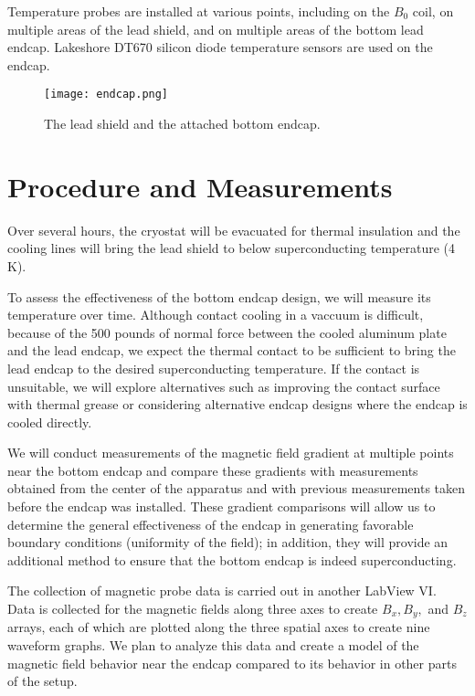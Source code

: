 \documentclass[twocolumn,aps,prb,citeautoscript]{revtex4-1}
\begin{document}
Temperature probes are installed at various points, including on the $B_0$
coil, on multiple areas of the lead shield, and on multiple areas of the
bottom lead endcap. Lakeshore DT670 silicon diode temperature sensors are
used on the endcap.

\begin{figure}
\texttt{[image: endcap.png]}
\caption{\label{fig:endcap}The lead shield and the attached bottom endcap.}
\end{figure}

\section{Procedure and Measurements}

Over several hours, the cryostat will be evacuated for thermal insulation and
the cooling lines will bring the lead shield to below superconducting
temperature (4 K).

To assess the effectiveness of the bottom endcap design, we will
measure its temperature over time. Although contact cooling in a vaccuum
is difficult, because of the 500 pounds of normal force between the
cooled aluminum plate and the lead endcap, we expect the thermal contact to be
sufficient to bring the lead endcap to the desired superconducting
temperature. If the contact is unsuitable, we will explore alternatives such as
improving the contact surface with thermal grease or considering alternative
endcap designs where the endcap is cooled directly. 

We will conduct measurements of the magnetic field gradient
at multiple points near the bottom endcap and compare these
gradients with measurements obtained from the center of the apparatus
and with previous measurements taken before the endcap was installed. These
gradient comparisons will allow us to determine the general effectiveness of
the endcap in generating favorable boundary conditions (uniformity of the
field); in addition, they will provide an additional method to ensure that the
bottom endcap is indeed superconducting.

The collection of magnetic probe data
is carried out in another LabView VI. Data is collected
for the magnetic fields along three axes to create $B_x, B_y,$ and $B_z$
arrays, each of which are plotted along the three spatial axes to create nine
waveform graphs. We plan to analyze this data and create a model of the
magnetic field behavior near the endcap compared to its behavior in other parts
of the setup.
\end{document}
